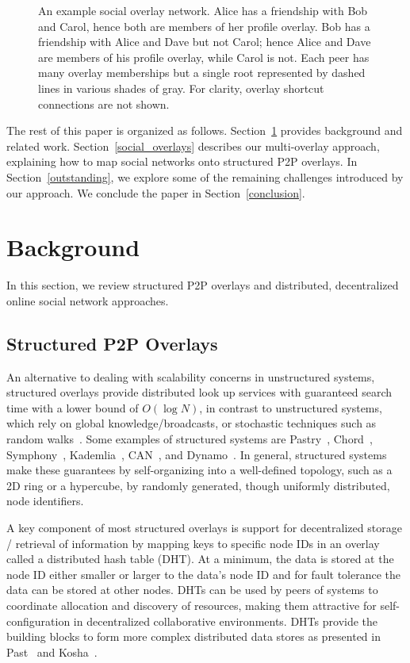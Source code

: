 \documentclass[conference]{IEEEtran}
\begin{document}
\begin{figure}[h]
\centering
{}
\caption{An example social overlay network.  Alice has a friendship with Bob and
Carol, hence both are members of her profile overlay. Bob has a
friendship with Alice and Dave but not Carol; hence Alice and Dave are members of
his profile overlay, while Carol is not.  Each peer has many overlay memberships
but a single root represented by dashed lines in various shades of gray.
For clarity, overlay shortcut connections are not shown.}
\label{fig:system}
\end{figure}

The rest of this paper is organized as follows.  Section~\ref{background}
provides background and related work.  Section~\ref{social_overlays} describes
our multi-overlay approach, explaining how to map social networks onto structured
P2P overlays.  In Section~\ref{outstanding}, we explore some of the remaining
challenges introduced by our approach.  We conclude the paper in
Section~\ref{conclusion}.

\section{Background}
\label{background}
In this section, we review structured P2P overlays and distributed,
decentralized online social network approaches.
\subsection{Structured P2P Overlays}
An alternative to dealing with scalability concerns in unstructured systems,
structured overlays provide distributed look up services with guaranteed search
time with a lower bound of $O(\log N)$, in contrast to unstructured systems,
which rely on global knowledge/broadcasts, or stochastic techniques such as
random walks~\cite{unstructured_v_structured}.  Some examples of structured
systems are Pastry~\cite{pastry}, Chord~\cite{chord}, Symphony~\cite{symphony},
Kademlia~\cite{kademlia}, CAN~\cite{can}, and Dynamo~\cite{dynamo}.  In
general, structured systems make these guarantees by self-organizing into a
well-defined topology, such as a 2D ring or a hypercube, by randomly generated,
though uniformly distributed, node identifiers.

A key component of most structured overlays is support for decentralized storage
/ retrieval of information by mapping keys to specific node IDs in an overlay
called a distributed hash table (DHT).  At a minimum, the data is stored at the
node ID either smaller or larger to the data's node ID and for fault tolerance
the data can be stored at other nodes.  DHTs can be used by peers of systems to
coordinate allocation and discovery of resources, making them attractive for
self-configuration in decentralized collaborative environments.  DHTs provide the
building blocks to form more complex distributed data stores as presented in
Past~\cite{past} and Kosha~\cite{kosha}.
\end{document}
